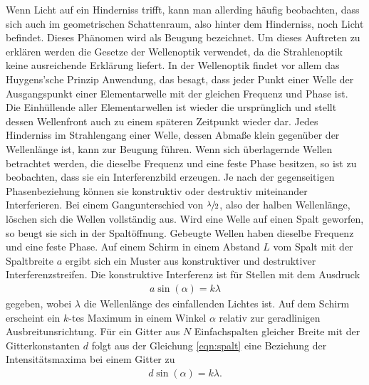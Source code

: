 \noindent
Wenn Licht auf ein Hinderniss trifft, kann man allerding häufig beobachten, dass sich auch im geometrischen Schattenraum, also hinter dem Hinderniss, noch Licht befindet.
Dieses Phänomen wird als Beugung bezeichnet. Um dieses Auftreten zu erklären werden die Gesetze der Wellenoptik verwendet, da die Strahlenoptik keine ausreichende Erklärung liefert.  \newline
In der Wellenoptik findet vor allem das Huygens'sche Prinzip Anwendung, das besagt, dass jeder Punkt einer Welle der Ausgangspunkt einer Elementarwelle mit der gleichen Frequenz und Phase ist.
Die Einhüllende aller Elementarwellen ist wieder die ursprünglich und stellt dessen Wellenfront auch zu einem späteren Zeitpunkt wieder dar.
Jedes Hinderniss im Strahlengang einer Welle, dessen Abmaße klein gegenüber der Wellenlänge ist, kann zur Beugung führen. \newline
Wenn sich überlagernde Wellen betrachtet werden, die dieselbe Frequenz und eine feste Phase besitzen, so ist zu beobachten, dass sie ein Interferenzbild erzeugen. Je nach
der gegenseitigen Phasenbeziehung können sie konstruktiv oder destruktiv miteinander Interferieren. Bei einem Gangunterschied von $\sfrac{\lambda}{2}$, also der halben Wellenlänge,
löschen sich die Wellen vollständig aus.
Wird eine Welle auf einen Spalt geworfen, so beugt sie sich in der Spaltöffnung. Gebeugte Wellen haben dieselbe Frequenz und eine feste Phase. Auf einem Schirm in einem Abstand $L$ vom Spalt mit der Spaltbreite $a$
ergibt sich ein Muster aus konstruktiver und destruktiver Interferenzstreifen. Die konstruktive Interferenz ist für Stellen mit dem Ausdruck
\begin{align}
    a\sin(\alpha)=k\lambda
    \label{eqn:spalt}
\end{align}
gegeben, wobei $\lambda$ die Wellenlänge des einfallenden Lichtes ist. Auf dem Schirm erscheint ein $k$-tes Maximum in einem Winkel $\alpha$ relativ zur geradlinigen Ausbreitunsrichtung.
Für ein Gitter aus $N$ Einfachspalten gleicher Breite mit der Gitterkonstanten $d$ folgt aus der Gleichung \eqref{eqn:spalt} eine Beziehung der Intensitätsmaxima bei einem Gitter zu
\begin{align}
    d\sin(\alpha)=k\lambda.
    \label{eqn:lambda}
\end{align}